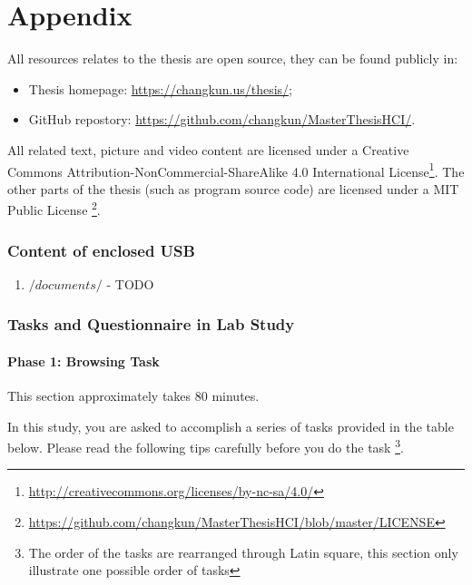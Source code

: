 \part*{Appendix}
\appendix
{}
\fancyhead[LE,RO,LO,RE]{} %

All resources relates to the thesis are open source, 
they can be found publicly in:

\begin{itemize}
    \item Thesis homepage: \url{https://changkun.us/thesis/};
    \item GitHub repostory: \url{https://github.com/changkun/MasterThesisHCI/}.
\end{itemize}

All related text, picture and video content are licensed under a 
Creative Commons Attribution-NonCommercial-ShareAlike 4.0 International 
License\footnote{\url{http://creativecommons.org/licenses/by-nc-sa/4.0/}}.
The other parts of the thesis (such as program source code) are licensed 
under a MIT Public License
\footnote{\url{https://github.com/changkun/MasterThesisHCI/blob/master/LICENSE}}.

\section{Content of enclosed USB}
\label{appendix:a}

\begin{enumerate}
    \item $/documents/$ - TODO
\end{enumerate}


\section{Tasks and Questionnaire in Lab Study}
\label{appendix:b}

\subsection{Phase 1: Browsing Task}

This section approximately takes 80 minutes.

In this study, you are asked to accomplish a series of tasks provided in the table below.
Please read the following tips carefully before you do the task \footnote{The order of the tasks
are rearranged through Latin square, this section only illustrate one possible order of tasks}.

